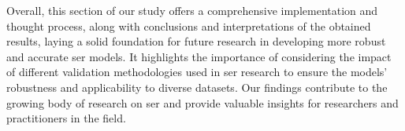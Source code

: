Overall, this section of our study offers a comprehensive implementation and thought process, along with conclusions and interpretations of the obtained results, laying a solid foundation for future research in developing more robust and accurate \ac{ser} models. It highlights the importance of considering the impact of different validation methodologies used in \ac{ser} research to ensure the models' robustness and applicability to diverse datasets. Our findings contribute to the growing body of research on \ac{ser} and provide valuable insights for researchers and practitioners in the field.
